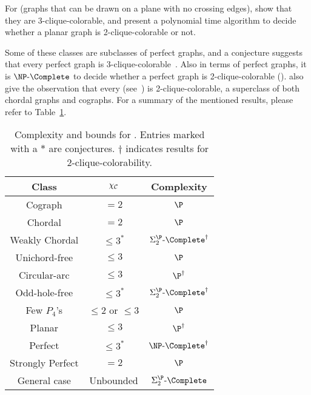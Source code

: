 For  (graphs that can be drawn on a plane with no crossing edges), \citep{clique_coloring_planar} show that they are 3-clique-colorable, and \citep{clique_color_perfect_np_complete} present a polynomial time algorithm to decide whether a planar graph is 2-clique-colorable or not.

Some of these classes are subclasses of perfect graphs, and a conjecture suggests that every perfect graph is 3-clique-colorable~\citep{maximal_clique_coloring}.
Also in terms of perfect graphs, it is $\NPc$ to decide whether a perfect graph is 2-clique-colorable (\cite{clique_color_perfect_np_complete}).
\citep{clique_oddhole} also give the observation that every  (see~\citep{strongly_perfect}) is 2-clique-colorable, a superclass of both chordal graphs and cographs.
For a summary of the mentioned results, please refer to Table~\ref{tab:clique_color_complexity}.

\begin{table}[!htb]
    \centering
    \begin{tabular}{c|c|c}
        \hline
        \hline
        Class            & $\chi_{\mathcal{C}}$             & Complexity \\
        \hline
        Cograph          & $= 2$                & $\P$\\
        Chordal          & $= 2$                & $\P$\\
        Weakly Chordal   & $\leq 3^*$           & $\SiP{2}\text{-}\Complete^\dag$\\
        Unichord-free    & $\leq 3 $            & $\P$ \\
        Circular-arc     & $\leq 3$             & $\P^\dag$ \\
        Odd-hole-free    & $\leq 3^*$           & $\SiP{2}\text{-}\Complete^\dag$\\
        Few $P_4$'s      & $\leq 2$ or $\leq 3$ & $\P$\\
        Planar           & $\leq 3$             & $\P^\dag$\\
        Perfect          & $\leq 3^*$           & $\NPc^\dag$\\ 
        Strongly Perfect & $= 2$                & $\P$\\
        General case     & Unbounded            & $\SiP{2}\text{-}\Complete$\\
        \hline
        \hline
    \end{tabular}
    \caption{Complexity and bounds for . Entries marked with a $*$ are conjectures. $\dag$ indicates results for 2-clique-colorability.}
    \label{tab:clique_color_complexity}
\end{table}

